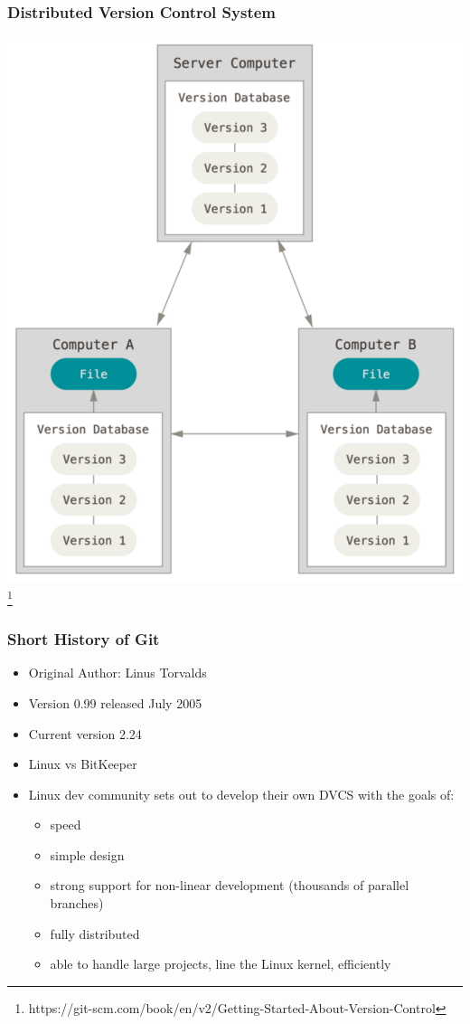 \begin{frame}
  \frametitle{Distributed Version Control System}
  \centering
  \includegraphics[height=0.80\textheight]{distributed-vcs}
  \footnote{https://git-scm.com/book/en/v2/Getting-Started-About-Version-Control}
\end{frame}

\begin{frame}
  \frametitle{Short History of Git}
  \begin{itemize}
    \item Original Author: Linus Torvalds
    \item Version 0.99 released July 2005
    \item Current version 2.24
    \item Linux vs BitKeeper
    \item Linux dev community sets out to develop their own DVCS with the
      goals of:
      \begin{itemize}
        \item speed
        \item simple design
        \item strong support for non-linear development (thousands of parallel
          branches)
        \item fully distributed
        \item able to handle large projects, line the Linux kernel, efficiently
      \end{itemize}
  \end{itemize}
\end{frame}

